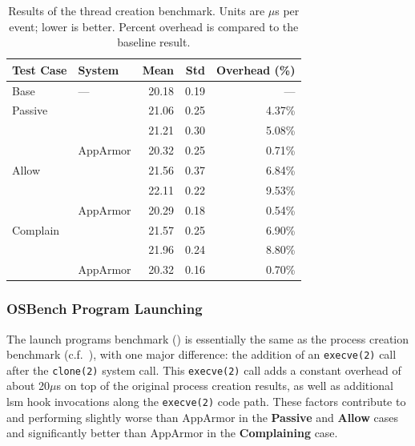 \begingroup\small
\begin{longtable}[c]{llrrr}
  \caption[Results of the thread creation benchmark]{
    Results of the thread creation benchmark. Units are $\mu$s per event; lower is
    better. Percent overhead is compared to the baseline result.
  }%
  \label{tab:phoronix-threads}\\
  \toprule
   Test Case & System         &  Mean & Std  & Overhead (\%)\\
   \midrule
   Base      & ---            & 20.18 & 0.19 & ---     \\
   \midrule
   Passive   & \bpfbox{}      & 21.06 & 0.25 & 4.37\% \\
             & \bpfcontain{}  & 21.21 & 0.30 & 5.08\% \\
             & AppArmor       & 20.32 & 0.25 & 0.71\% \\
   \midrule
   Allow     & \bpfbox{}      & 21.56 & 0.37 & 6.84\% \\
             & \bpfcontain{}  & 22.11 & 0.22 & 9.53\% \\
             & AppArmor       & 20.29 & 0.18 & 0.54\% \\
   \midrule
   Complain  & \bpfbox{}      & 21.57 & 0.25 & 6.90\% \\
             & \bpfcontain{}  & 21.96 & 0.24 & 8.80\% \\
             & AppArmor       & 20.32 & 0.16 & 0.70\% \\
  \bottomrule
\end{longtable}
\endgroup

\subsubsection{OSBench Program Launching}

The launch programs benchmark () is essentially the
same as the process creation benchmark (c.f.~), with one
major difference: the addition of an \texttt{execve(2)} call after the \texttt{clone(2)}
system call. This \texttt{execve(2)} call adds a constant overhead of about 20$\mu$s on
top of the original process creation results, as well as additional \gls{lsm} hook
invocations along the \texttt{execve(2)} code path. These factors contribute to \bpfbox{}
and \bpfcontain{} performing slightly worse than AppArmor in the \textbf{Passive} and
\textbf{Allow} cases and significantly better than AppArmor in the \textbf{Complaining}
case.

